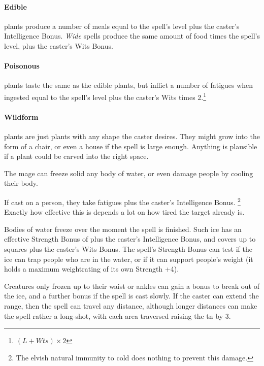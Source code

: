 \begin{multicols}{2}
\paragraph{Edible} plants produce a number of meals equal to the spell's level plus the caster's Intelligence Bonus.
\textit{Wide} spells produce the same amount of food times the spell's level, plus the caster's Wits Bonus.

\paragraph{Poisonous} plants taste the same as the edible plants, but inflict a number of \glspl{fatigue} when ingested equal to the spell's level plus the caster's Wits times 2.\footnote{$(L + Wts)\times 2$}

\paragraph{Wildform} plants are just plants with any shape the caster desires.
They might grow into the form of a chair, or even a house if the spell is large enough.
Anything is plausible if a plant could be carved into the right space.

The mage can freeze solid any body of water, or even damage people by cooling their body.

If cast on a person, they take  \glspl{fatigue} plus the caster's Intelligence Bonus.%
\footnote{The elvish natural immunity to cold does nothing to prevent this damage.}
Exactly how effective this is depends a lot on how tired the target already is.

Bodies of water freeze over the moment the spell is finished.
Such ice has an effective Strength Bonus of  plus the caster's Intelligence Bonus, and covers up to  squares plus the caster's Wits Bonus.
The spell's Strength Bonus can test if the ice can trap people who are in the water, or if it can support people's weight (it holds a maximum \gls{weightrating} of its own Strength +4).

Creatures only frozen up to their waist or ankles can gain a bonus to break out of the ice, and a further bonus if the spell is cast slowly.
If the caster can extend the range, then the spell can travel any distance, although longer distances can make the spell rather a long-shot, with each area traversed raising the \gls{tn} by 3.


\end{multicols}
